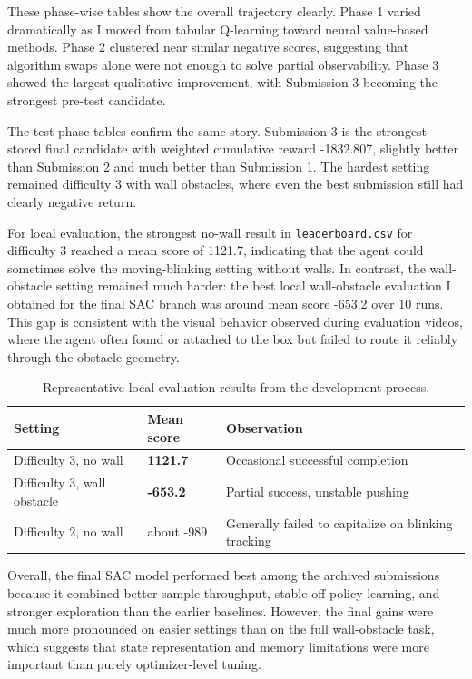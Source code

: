 \documentclass[11pt,oneside]{article}
\begin{document}
These phase-wise tables show the overall trajectory clearly. Phase 1 varied dramatically as I moved from tabular Q-learning toward neural value-based methods. Phase 2 clustered near similar negative scores, suggesting that algorithm swaps alone were not enough to solve partial observability. Phase 3 showed the largest qualitative improvement, with Submission 3 becoming the strongest pre-test candidate.

The test-phase tables confirm the same story. Submission 3 is the strongest stored final candidate with weighted cumulative reward -1832.807, slightly better than Submission 2 and much better than Submission 1. The hardest setting remained difficulty 3 with wall obstacles, where even the best submission still had clearly negative return.

For local evaluation, the strongest no-wall result in \texttt{leaderboard.csv} for difficulty 3 reached a mean score of 1121.7, indicating that the agent could sometimes solve the moving-blinking setting without walls. In contrast, the wall-obstacle setting remained much harder: the best local wall-obstacle evaluation I obtained for the final SAC branch was around mean score -653.2 over 10 runs. This gap is consistent with the visual behavior observed during evaluation videos, where the agent often found or attached to the box but failed to route it reliably through the obstacle geometry.

\begin{table}[h]
\centering
\small
\caption{Representative local evaluation results from the development process.}
\begin{tabular}{lll}
\toprule
Setting & Mean score & Observation \\
\midrule
Difficulty 3, no wall & \textbf{1121.7} & Occasional successful completion \\
Difficulty 3, wall obstacle & \textbf{-653.2} & Partial success, unstable pushing \\
Difficulty 2, no wall & about -989 & Generally failed to capitalize on blinking tracking \\
\bottomrule
\end{tabular}
\end{table}

Overall, the final SAC model performed best among the archived submissions because it combined better sample throughput, stable off-policy learning, and stronger exploration than the earlier baselines. However, the final gains were much more pronounced on easier settings than on the full wall-obstacle task, which suggests that state representation and memory limitations were more important than purely optimizer-level tuning.
\end{document}
